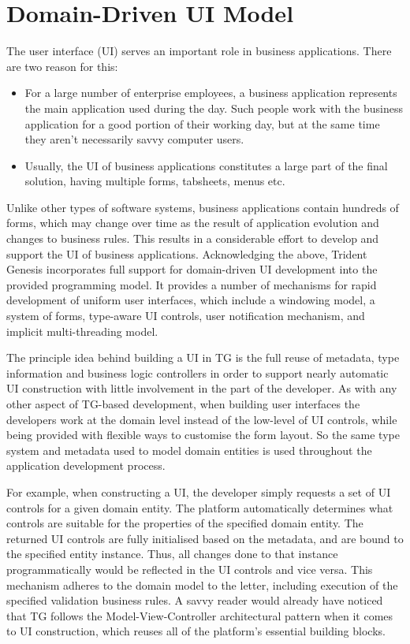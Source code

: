 \section{Domain-Driven UI Model}\label{sec:05}

  The user interface (UI) serves an important role in business applications.
  There are two reason for this:
  \begin{itemize}
   \item For a large number of enterprise employees, a business application represents the main application used during the day. 
	 Such people work with the business application for a good portion of their working day, but at the same time they aren't necessarily savvy computer users.
   \item Usually, the UI of business applications constitutes a large part of the final solution, having multiple forms, tabsheets, menus etc.
  \end{itemize}
  Unlike other types of software systems, business applications contain hundreds of forms, which may change over time as the result of application evolution and changes to business rules.
  This results in a considerable effort to develop and support the UI of business applications.
  Acknowledging the above, Trident Genesis incorporates full support for domain-driven UI development into the provided programming model.
  It provides a number of mechanisms for rapid development of uniform user interfaces, which include a windowing model, a system of forms, type-aware UI controls, user notification mechanism, and implicit multi-threading model.
  
  The principle idea behind building a UI in TG is the full reuse of metadata, type information and business logic controllers in order to support nearly automatic UI construction with little involvement in the part of the developer.
  As with any other aspect of TG-based development, when building user interfaces the developers work at the domain level instead of the low-level of UI controls, while being provided with flexible ways to customise the form layout.
  So the same type system and metadata used to model domain entities is used throughout the application development process.
  
  For example, when constructing a UI, the developer simply requests a set of UI controls for a given domain entity.
  The platform automatically determines what controls are suitable for the properties of the specified domain entity.
  The returned UI controls are fully initialised based on the metadata, and are bound to the specified entity instance.
  Thus, all changes done to that instance programmatically would be reflected in the UI controls and vice versa.
  This mechanism adheres to the domain model to the letter, including execution of the specified validation business rules.
  A savvy reader would already have noticed that TG follows the Model-View-Controller architectural pattern when it comes to UI construction, which reuses all of the platform's essential building blocks.


